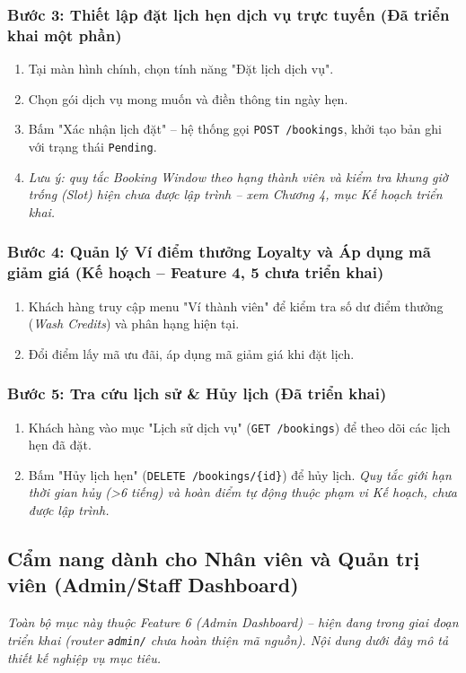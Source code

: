 \subsubsection{Bước 3: Thiết lập đặt lịch hẹn dịch vụ trực tuyến (Đã triển khai một phần)}
\begin{enumerate}
    \item Tại màn hình chính, chọn tính năng "Đặt lịch dịch vụ".
    \item Chọn gói dịch vụ mong muốn và điền thông tin ngày hẹn.
    \item Bấm "Xác nhận lịch đặt" -- hệ thống gọi \texttt{POST /bookings}, khởi tạo bản ghi với trạng thái \texttt{Pending}.
    \item \textit{Lưu ý: quy tắc Booking Window theo hạng thành viên và kiểm tra khung giờ trống (Slot) hiện chưa được lập trình -- xem Chương 4, mục Kế hoạch triển khai.}
\end{enumerate}

\subsubsection{Bước 4: Quản lý Ví điểm thưởng Loyalty và Áp dụng mã giảm giá (Kế hoạch -- Feature 4, 5 chưa triển khai)}
\begin{enumerate}
    \item Khách hàng truy cập menu "Ví thành viên" để kiểm tra số dư điểm thưởng (\textit{Wash Credits}) và phân hạng hiện tại.
    \item Đổi điểm lấy mã ưu đãi, áp dụng mã giảm giá khi đặt lịch.
\end{enumerate}

\subsubsection{Bước 5: Tra cứu lịch sử \& Hủy lịch (Đã triển khai)}
\begin{enumerate}
    \item Khách hàng vào mục "Lịch sử dịch vụ" (\texttt{GET /bookings}) để theo dõi các lịch hẹn đã đặt.
    \item Bấm "Hủy lịch hẹn" (\texttt{DELETE /bookings/\{id\}}) để hủy lịch. \textit{Quy tắc giới hạn thời gian hủy (>6 tiếng) và hoàn điểm tự động thuộc phạm vi Kế hoạch, chưa được lập trình.}
\end{enumerate}

\subsection{Cẩm nang dành cho Nhân viên và Quản trị viên (Admin/Staff Dashboard)}
\textit{Toàn bộ mục này thuộc Feature 6 (Admin Dashboard) -- hiện đang trong giai đoạn triển khai (router \texttt{admin/} chưa hoàn thiện mã nguồn). Nội dung dưới đây mô tả thiết kế nghiệp vụ mục tiêu.}


